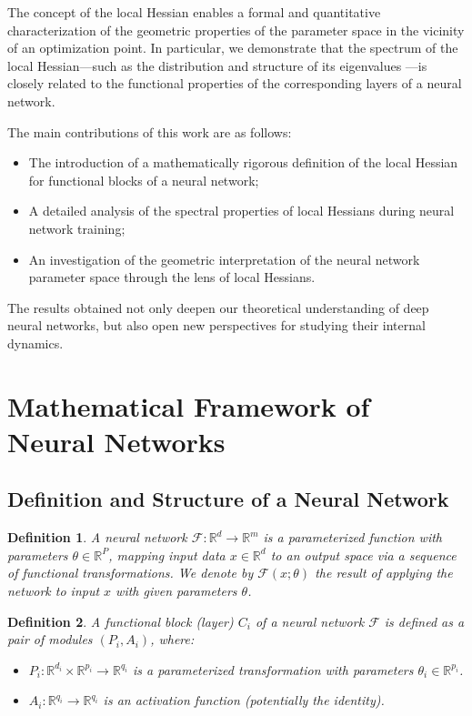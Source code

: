 \documentclass[a4paper,12pt]{article}
\newtheorem{definition}{Definition}
\begin{document}
The concept of the local Hessian enables a formal and quantitative characterization of the geometric
properties of the parameter space in the vicinity of an optimization point. In particular, we demonstrate
that the spectrum of the local Hessian—such as the distribution and structure of its eigenvalues
\cite{ghorbani2019investigation}—is closely related to the functional properties of the corresponding layers
of a neural network.

The main contributions of this work are as follows:
\begin{itemize}
  \item The introduction of a mathematically rigorous definition of the local Hessian for functional blocks
    of a neural network;
  \item A detailed analysis of the spectral properties of local Hessians during neural network training;
  \item An investigation of the geometric interpretation of the neural network parameter space through the
    lens of local Hessians.
\end{itemize}

The results obtained not only deepen our theoretical understanding of deep neural networks, but also open new
perspectives for studying their internal dynamics.

\section{Mathematical Framework of Neural Networks}

\subsection{Definition and Structure of a Neural Network}

\begin{definition}
  A neural network $\mathcal{F}: \mathbb{R}^d \rightarrow \mathbb{R}^m$ is a parameterized function with
  parameters $\theta \in \mathbb{R}^P$, mapping input data $x \in \mathbb{R}^d$ to an output space via a
  sequence of functional transformations. We denote by $\mathcal{F}(x; \theta)$ the result of applying the
  network to input $x$ with given parameters $\theta$.
\end{definition}

\begin{definition}
  A functional block (layer) $C_i$ of a neural network $\mathcal{F}$ is defined as a pair of modules $(P_i,
  A_i)$, where:
  \begin{itemize}
    \item $P_i: \mathbb{R}^{d_i} \times \mathbb{R}^{p_i} \rightarrow \mathbb{R}^{q_i}$ is a parameterized
      transformation with parameters $\theta_i \in \mathbb{R}^{p_i}$.
    \item $A_i: \mathbb{R}^{q_i} \rightarrow \mathbb{R}^{q_i}$ is an activation function (potentially the identity).
  \end{itemize}
\end{definition}
\end{document}

